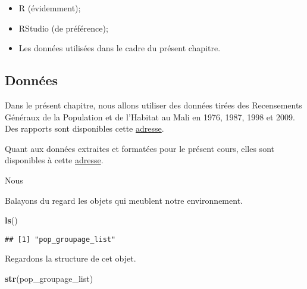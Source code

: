 \documentclass[]{book}
\newenvironment{Shaded}{\begin{snugshade}}{\end{snugshade}}
\newcommand{\KeywordTok}[1]{\textcolor[rgb]{0.13,0.29,0.53}{\textbf{#1}}}
\newcommand{\NormalTok}[1]{#1}
\begin{document}
\begin{itemize}
\item
  R (évidemment);
\item
  RStudio (de préférence);
\item
  Les données utilisées dans le cadre du présent chapitre.
\end{itemize}

\subsection{Données}\label{donnees}

Dans le présent chapitre, nous allons utiliser des données tirées des
Recensements Généraux de la Population et de l'Habitat au Mali en 1976,
1987, 1998 et 2009. Des rapports sont disponibles cette
\href{http://www.instat-mali.org/index.php/publications/conditions-vie-societe/demographie}{adresse}.

Quant aux données extraites et formatées pour le présent cours, elles
sont disponibles à cette
\href{https://github.com/fousseynoubah/dswr_slides/blob/master/3_Sexprimer_dans_R/data/data.RData?raw=true}{adresse}.

Nous

Balayons du regard les objets qui meublent notre environnement.

\begin{Shaded}
\begin{Highlighting}[]
\KeywordTok{ls}\NormalTok{()}
\end{Highlighting}
\end{Shaded}

\begin{verbatim}
## [1] "pop_groupage_list"
\end{verbatim}

Regardons la structure de cet objet.

\begin{Shaded}
\begin{Highlighting}[]
\KeywordTok{str}\NormalTok{(pop_groupage_list)}
\end{Highlighting}
\end{Shaded}
\end{document}
